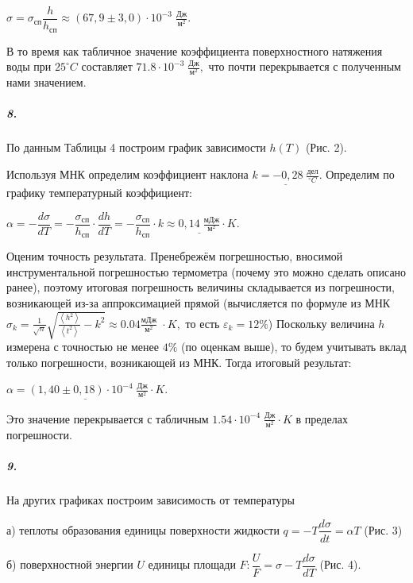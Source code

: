 \documentclass[a4paper, 12pt]{article}
\begin{document}
\bigskip

$
\sigma = \sigma_{\text{сп}}\dfrac{h}{h_{\text{сп}}} \approx (67,9 \pm 3,0)\cdot 10^{-3} \; \frac{\text{Дж}}{\text{м}^2}.
$

\bigskip

В то время как табличное значение коэффициента поверхностного натяжения воды при $25^\circ C$ составляет $71.8 \cdot 10^{-3} \; \frac{\text{Дж}}{\text{м}^2}, $ что почти перекрывается с полученным нами значением. 

\subparagraph*{8.}По данным Таблицы 4 построим график зависимости  $h(T)$ (Рис. 2).


Используя МНК определим коэффициент наклона $\underline{k = -0,28 \; \frac{\text{дел}}{^\circ C}}$. 
Определим по графику температурный коэффициент:

\begin{center}
    $\alpha = - \dfrac{d\sigma}{dT} = -\dfrac{\sigma_{\text{сп}}}{h_{\text{сп}}}\cdot \dfrac{d h}{d T} = -\dfrac{\sigma_{\text{сп}}}{h_{\text{сп}}}\cdot k \approx \underline{0,14 \; \frac{\text{мДж}}{\text{м}^2}} \cdot K$. 
\end{center}  
 
Оценим точность результата. Пренебрежём погрешностью, вносимой инструментальной погрешностью термометра (почему это можно сделать описано ранее), поэтому итоговая погрешность величины складывается из погрешности, возникающей из-за аппроксимацией прямой (вычисляется по формуле из МНК $\sigma_k = \frac{1}{\sqrt{n}}\sqrt{\frac{\left< h^2\right>}{\left< t^2\right>} - k^2} \approx 0.04 \frac{\text{мДж}}{\text{м}^2} \; \cdot K,$  то есть $\varepsilon_k =  12 \%$) Поскольку величина $h$ измерена с точностью не менее $4\%$ (по оценкам выше), то будем учитывать вклад только погрешности, возникающей из МНК. Тогда итоговый результат:


\begin{center}
    $
    \underline{\alpha = ( 1,40 \pm 0,18)  \cdot 10^{-4} \; \frac{\text{Дж}}{\text{м}^2} \cdot K}.
    $
\end{center}

Это значение перекрывается с табличным $1.54 \cdot 10^{-4} \; \frac{\text{Дж}}{\text{м}^2} \cdot K$ в пределах погрешности. 

\subparagraph*{9.}На других графиках построим зависимость от температуры 


а) теплоты образования единицы поверхности жидкости $q=-T\dfrac{d\sigma}{dt} = \alpha T$ (Рис. 3) 

б) поверхностной энергии $U$ единицы площади $F:   \dfrac{U}{F}= \sigma - T\dfrac{d\sigma}{dT}$ (Рис. 4). 
\end{document}
